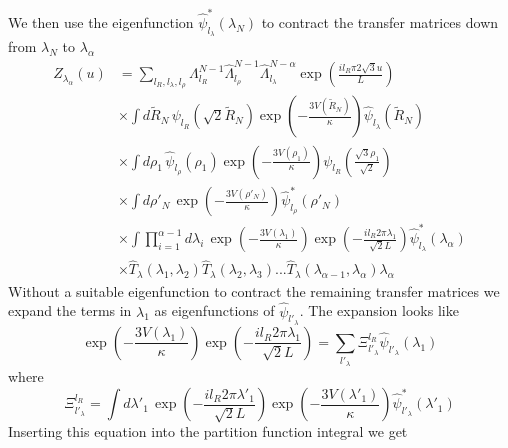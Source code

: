 %
We then use the eigenfunction $\hat{\psi}^{*}_{l_\lambda}\left(\lambda_{N}\right)$ to contract the transfer matrices down from $\lambda_N$ to $\lambda_\alpha$ 
%
\begin{align}\label{col_mxd_z_lambda2}
Z_{\lambda_\alpha}\left(u\right) &=\sum_{l_R,l_\lambda,l_\rho}\Lambda_{l_R}^{N-1}\hat{\Lambda}_{l_\rho}^{N-1}\hat{\Lambda}_{l_\lambda}^{N-\alpha}\exp\left(\frac{il_{R}\pi 2\sqrt{3}u}{L}\right)\nonumber\\
&\times\int d\tilde{R}_N\,\psi_{l_R}\left(\sqrt{2}\tilde{R}_{N}\right)\exp\left(-\frac{3V\left(\tilde{R}_N\right)}{\kappa}\right)\hat{\psi}_{l_\lambda}\left(\tilde{R}_N\right)\nonumber\\
&\times\int d\rho_1\, \hat{\psi}_{l_\rho}\left(\rho_{1}\right) \exp\left(-\frac{3V(\rho_{1})}{\kappa}\right)\psi_{l_R}\left( \frac{\sqrt{3}\rho_1}{\sqrt{2}}\right)\nonumber\\
&\times\int d\rho'_N\,\exp\left(-\frac{3V(\rho'_{N})}{\kappa}\right)\hat{\psi}^{*}_{l_\rho}\left(\rho'_{N}\right)\nonumber\\
&\times\int\prod^{\alpha-1}_{i=1}d\lambda_i\,\exp\left(-\frac{3V(\lambda_{1})}{\kappa}\right)\exp\left(-\frac{il_{R}2\pi\lambda_1}{\sqrt{2}L} \right)\hat{\psi}^{*}_{l_\lambda}\left(\lambda_{\alpha}\right)\nonumber\\
&\times \hat{T}_{\lambda}(\lambda_1,\lambda_2)\hat{T}_{\lambda}(\lambda_2,\lambda_3)...\hat{T}_{\lambda}(\lambda_{\alpha-1},\lambda_{\alpha})\lambda_{\alpha} 
\end{align}
%
Without a suitable eigenfunction to contract the remaining transfer matrices we expand the terms in $\lambda_{1}$ as eigenfunctions of $\hat{\psi}_{l'_{\lambda}}$. The expansion looks like
%
\begin{equation}
\exp\left(-\frac{3V(\lambda_{1})}{\kappa}\right)\exp\left(-\frac{il_{R}2\pi\lambda_1}{\sqrt{2}L} \right) = \sum_{l'_{\lambda}}\Xi^{l_{R}}_{l'_{\lambda}}\hat{\psi}_{l'_{\lambda}}\left(\lambda_1\right)
\end{equation}
%
where
%
\begin{equation}
\Xi^{l_{R}}_{l'_{\lambda}}=\int d\lambda'_{1}\,\exp\left(-\frac{il_{R}2\pi\lambda'_1}{\sqrt{2}L} \right)\exp\left(-\frac{3V(\lambda'_{1})}{\kappa}\right)\hat{\psi}^{*}_{l'_\lambda}\left(\lambda'_{1}\right)
\end{equation}
%
Inserting this equation into the partition function integral we get
%
